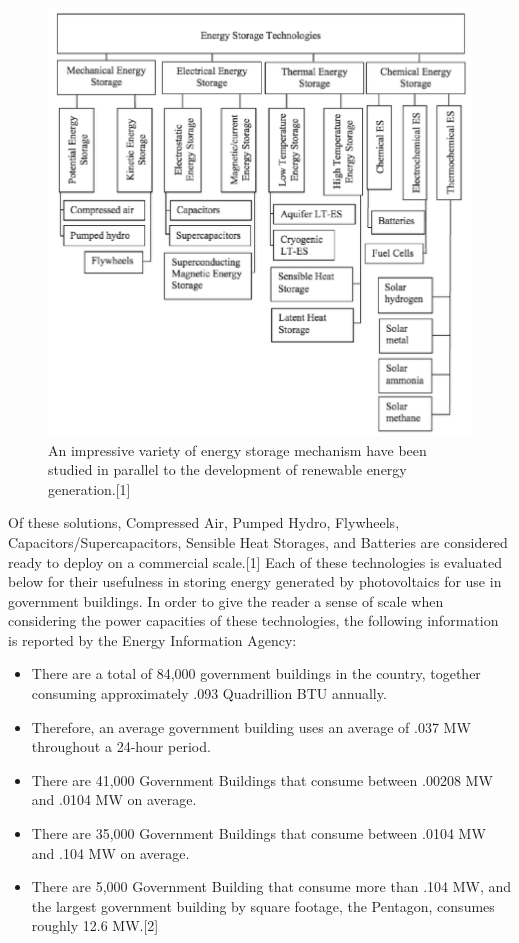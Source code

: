 \begin{figure}
\begin{center}
\includegraphics[scale=1.0]{pics/PatrickFigure1.png}
\caption{An impressive variety of energy storage mechanism have been studied in
parallel to the development of renewable energy generation.[1] }
\label{p1}
\end{center}
\end{figure}

Of these solutions, Compressed Air, Pumped Hydro, Flywheels,
Capacitors/Supercapacitors, Sensible Heat Storages, and Batteries are
considered ready to deploy on a commercial scale.[1] Each of these technologies
is evaluated below for their usefulness in storing energy generated by
photovoltaics for use in government buildings. In order to give the reader a
sense of scale when considering the power capacities of these technologies, the
following information is reported by the Energy Information Agency:
\begin{itemize}
\item There are a total of 84,000 government buildings in the country, together
consuming approximately .093 Quadrillion BTU annually.
\item Therefore, an average government building uses an average of .037 MW
throughout a 24-hour period.
\item There are 41,000 Government Buildings that consume between .00208 MW and
.0104 MW on average.
\item There are 35,000 Government Buildings that consume between .0104 MW and
.104 MW on average.
\item There are 5,000 Government Building that consume more than .104 MW, and
the largest government building by square footage, the Pentagon, consumes roughly
12.6 MW.[2]
\end{itemize}

